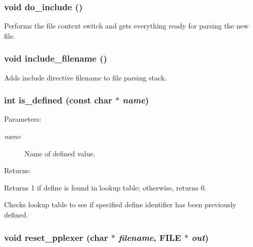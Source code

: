 \subsubsection{\setlength{\rightskip}{0pt plus 5cm}void do\_\-include ()\hspace{0.3cm}{\tt  [static]}}\label{pplexer_8c_a137}


Performs the file context switch and gets everything ready for parsing the new file. 
\subsubsection{\setlength{\rightskip}{0pt plus 5cm}void include\_\-filename ()\hspace{0.3cm}{\tt  [static]}}\label{pplexer_8c_a136}


Adds include directive filename to file parsing stack. 
\subsubsection{\setlength{\rightskip}{0pt plus 5cm}int is\_\-defined (const char $\ast$ {\em name})\hspace{0.3cm}{\tt  [static]}}\label{pplexer_8c_a135}


\begin{Desc}
\item[Parameters: ]\par
\begin{description}
\item[{\em 
name}]Name of defined value.\end{description}
\end{Desc}
\begin{Desc}
\item[Returns: ]\par
Returns 1 if define is found in lookup table; otherwise, returns 0.\end{Desc}
Checks lookup table to see if specified define identifier has been previously defined. 
\subsubsection{\setlength{\rightskip}{0pt plus 5cm}void reset\_\-pplexer (char $\ast$ {\em filename}, FILE $\ast$ {\em out})}\label{pplexer_8c_a143}


